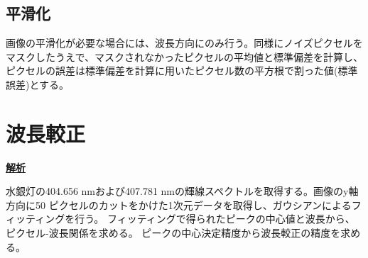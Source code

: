 \documentclass[a4paper,11pt,uplatex]{jsbook}
\begin{document}
\subsection{平滑化}
画像の平滑化が必要な場合には、波長方向にのみ行う。同様にノイズピクセルをマスクしたうえで、マスクされなかったピクセルの平均値と標準偏差を計算し、ピクセルの誤差は標準偏差を計算に用いたピクセル数の平方根で割った値(標準誤差)とする。

\section{波長較正}
\noindent \textbf{\underline{解析}}\par
水銀灯の404.656 nmおよび407.781 nmの輝線スペクトルを取得する。画像のy軸方向に50 ピクセルのカットをかけた1次元データを取得し、ガウシアンによるフィッティングを行う。
フィッティングで得られたピークの中心値と波長から、ピクセル-波長関係を求める。
ピークの中心決定精度から波長較正の精度を求める。
\end{document}
